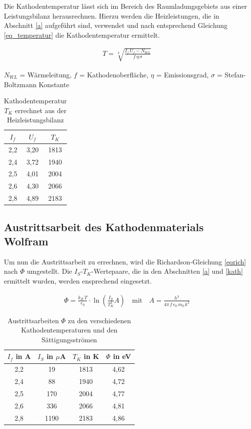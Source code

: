Die Kathodentemperatur lässt sich im Bereich des Raumladungsgebiets aus einer Leistungsbilanz herausrechnen. Hierzu werden die Heizleistungen,
die in Abschnitt \ref{a} aufgeführt sind, verwendet und nach entsprechend Gleichung \eqref{eq_temperatur} die Kathodentemperatur ermittelt.

\begin{formel}
 \begin{align}
  T = \sqrt[4]{\frac{I_f\,U_f - N_{WL}}{f \, \eta \, \sigma}}
 \end{align}
\caption*{\small{$N_{WL}$ = Wärmeleitung, $f$ = Kathodenoberfläche, $\eta$ = Emissionsgrad, $\sigma$ = Stefan-Boltzmann Konstante}}
\end{formel}


\begin{table}[H]
 \begin{tabular}{c|c|c}
  $I_f$ & $U_f$ & $T_K$ \\
  \hline
2,2&	3,20&	1813 \\
2,4&	3,72&	1940\\
2,5&	4,01&	2004\\
2,6&	4,30&	2066\\
2,8&	4,89&	2183\\
 \end{tabular}
\caption{Kathodentemperatur $T_K$ errechnet aus der Heizleistungsbilanz}
\end{table}

\subsection{Austrittsarbeit des Kathodenmaterials Wolfram}
\label{wolf}
Um nun die Austrittsarbeit zu errechnen, wird die Richardson-Gleichung \eqref{eqrich} nach  $\Phi$ umgestellt. Die $I_S$-$T_K$-Wertepaare,
die in den Abschnitten \ref{a} und \ref{kath} ermittelt wurden, werden ensprechend eingesetzt.

\begin{align}
 \Phi = \frac{k_B \, T}{e_0} \cdot \ln\left(\frac{I_S}{T_K^2}A \right) \quad \text{mit} \quad A = \frac{h^3}{4 \pi \, f \, e_0 \, m_0 \, k^2}
\end{align}

\begin{table}[H]
 \begin{tabular}{c|c|c|c}
$I_f$ in A & $I_S$ in $\mu$A & $T_K$ in K &$\Phi$ in eV \\
\hline
2,2&	19		&	1813&	4,62\\
2,4&	88		&	1940&	4,72\\
2,5&	170		&	2004&	4,77\\
2,6&	336		&	2066&	4,81\\
2,8&	1190	&	2183&	4,86 \\

 \end{tabular}
\caption{Austrittsarbeiten $\Phi$ zu den verschiedenen Kathodentemperaturen und den Sättigungsströmen}
\label{tabrich}
\end{table}

